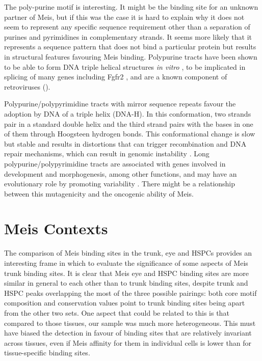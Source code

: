 
The poly-purine motif is interesting. It might be the binding site for an unknown partner of Meis, but if this was the case it is hard to explain why it does not seem to represent any specific sequence requirement other than a separation of purines and pyrimidines in complementary strands. It seems more likely that it represents a sequence pattern that does not bind a particular protein but results in structural features favouring Meis binding. Polypurine tracts have been shown to be able to form DNA triple helical structures \textit{in vitro} \parencite{Mirkin1987, Mooren1990}, to be implicated in splicing of many genes including Fgfr2 \parencite{Carstens2000}, and are a known component of retroviruses (\cite{Rausch2004}).%

Polypurine/polypyrimidine tracts with mirror sequence repeats favour the adoption by DNA of a triple helix (DNA-H). In this conformation, two strands pair in a standard double helix and the third strand pairs with the bases in one of them through Hoogsteen hydrogen bonds. This conformational change is slow but stable and results in distortions that can trigger recombination and DNA repair mechanisms, which can result in genomic instability \parencite{Wang2004}. Long polypurine/polypyrimidine tracts are associated with genes involved in development and morphogenesis, among other functions, and may have an evolutionary role by promoting variability \parencite{Bacolla2006}. There might be a relationship between this mutagenicity and the oncogenic ability of Meis.




\section{Meis Contexts}

The comparison of Meis binding sites in the trunk, eye and \acp{HSPC} provides an interesting frame in which to evaluate the significance of some aspects of Meis trunk binding sites. It is clear that Meis eye and \ac{HSPC} binding sites are more similar in general to each other than to trunk binding sites, despite trunk and \ac{HSPC} peaks overlapping the most of the three possible pairings: both core motif composition and conservation values point to trunk binding sites being apart from the other two sets. One aspect that could be related to this is that compared to those tissues, our sample was much more heterogeneous. This must have biased the detection in favour of binding sites that are relatively invariant across tissues, even if Meis affinity for them in individual cells is lower than for tissue-specific binding sites. 

